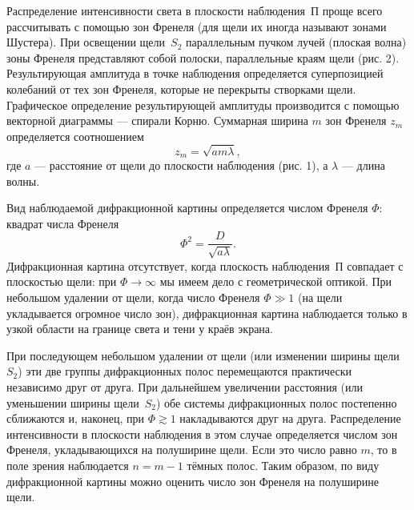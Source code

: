 \documentclass[a4paper,12pt]{article}
\begin{document}
	
	Распределение интенсивности света в плоскости наблюдения~П проще всего рассчитывать с помощью зон Френеля (для щели их иногда называют зонами Шустера). При освещении щели~$S_2$ параллельным пучком лучей (плоская волна) зоны Френеля представляют собой полоски, параллельные краям щели (рис. 2). Результирующая амплитуда в точке наблюдения определяется суперпозицией колебаний от тех зон Френеля, которые не перекрыты створками щели. Графическое определение результирующей амплитуды производится с помощью векторной диаграммы --- спирали Корню. Суммарная ширина $m$ зон Френеля $z_m$ определяется соотношением
	\begin{equation}
	z_m=\sqrt{am\lambda},
	\end{equation}
	где $a$ --- расстояние от щели до плоскости наблюдения (рис. 1), а $\lambda$ --- длина волны.
	
	Вид наблюдаемой дифракционной картины определяется числом Френеля $\Phi$: квадрат числа Френеля
	\begin{equation*}
	\Phi^2 = \dfrac{D}{\sqrt{a\lambda}}.
	\end{equation*}
	Дифракционная картина отсутствует, когда плоскость наблюдения~П совпадает с плоскостью щели: при $\Phi \rightarrow \infty$ мы имеем дело с геометрической оптикой. При небольшом удалении от щели, когда число Френеля $\Phi \gg 1$ (на щели укладывается огромное число зон), дифракционная картина наблюдается только в узкой области на границе света и тени у краёв экрана.
	
	При последующем небольшом удалении от щели (или изменении ширины щели $S_2$) эти две группы дифракционных полос перемещаются практически независимо друг от друга. При дальнейшем увеличении расстояния (или уменьшении ширины щели~$S_2$) обе системы дифракционных полос постепенно сближаются и, наконец, при $\Phi \gtrsim 1$ накладываются друг на друга. Распределение интенсивности в плоскости наблюдения в этом случае определяется числом зон Френеля, укладывающихся на полуширине щели. Если это число равно $m$, то в поле зрения наблюдается $n=m-1$ тёмных полос. Таким образом, по виду дифракционной картины можно оценить число зон Френеля на полуширине щели.
\end{document}
